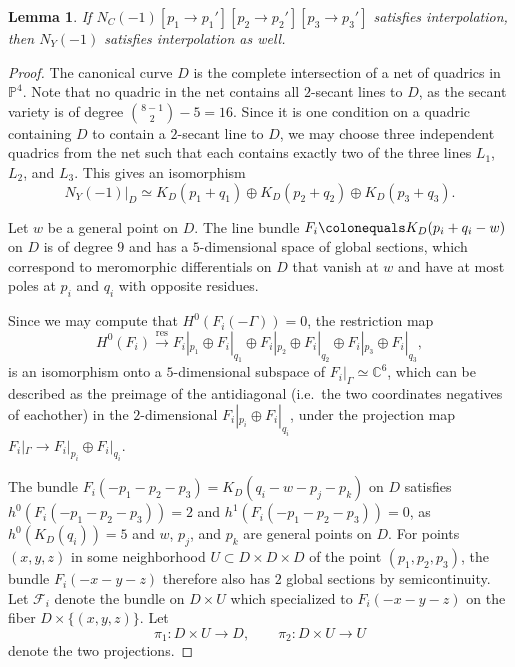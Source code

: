 \documentclass[11pt]{amsart}
\newcommand{\cc}{\mathbb{C}}
\newcommand{\pp}{\mathbb{P}}
\newcommand{\res}{\operatorname{res}}
\newtheorem{lem}[thm]{Lemma}
\theoremstyle{definition}
\theoremstyle{remark}
\begin{document}
\begin{lem}\label{canonical_degeneration}
If $N_C(-1)[p_1 \to p_1'][p_2 \to p_2'][p_3 \to p_3']$ satisfies interpolation,
then $N_Y(-1)$ satisfies interpolation as well.
\end{lem}
\begin{proof}
The canonical curve $D$ is the complete intersection of a net of quadrics in $\pp^4$.
Note that no quadric in the net contains all $2$-secant lines to $D$,
as the secant variety is of degree $\binom{8 - 1}{2} - 5 = 16$.
Since it is one condition on a quadric containing $D$ to contain a $2$-secant line to $D$,
we may choose 
three independent quadrics from the net such that each contains exactly two of the three lines $L_1$, $L_2$, and $L_3$.
This gives an isomorphism
\begin{equation}\label{canonical_restriction} N_Y(-1)|_D \simeq K_D(p_1+q_1) \oplus K_D(p_2+q_2) \oplus K_D(p_3+q_3). \end{equation}

Let $w$ be a general point on $D$.  The line bundle $F_i \colonequals K_D(p_i + q_i - w)$ on $D$ is of degree $9$ and has a $5$-dimensional space of global sections, which correspond to meromorphic differentials on $D$ that vanish at $w$ and have at most poles at $p_i$ and $q_i$ with opposite residues.

Since we may compute that $H^0(F_i(-\Gamma)) = 0$, the restriction map
\[H^0(F_i) \xrightarrow{\res} F_i|_{p_1} \oplus F_i|_{q_1} \oplus F_i|_{p_2} \oplus F_i|_{q_2} \oplus F_i|_{p_3} \oplus F_i|_{q_3}, \]
is an isomorphism onto a $5$-dimensional subspace of $F_i |_{\Gamma} \simeq \cc^6$, which can be described
as the preimage of the antidiagonal (i.e.\ the two coordinates negatives
of eachother)
in the $2$-dimensional $F_i|_{p_i} \oplus F_i|_{q_i}$, under the projection map $F_i|_{\Gamma} \to F_i|_{p_i} \oplus F_{i}|_{q_i}$.

The bundle $F_i(-p_1-p_2-p_3) = K_D(q_i - w- p_j-p_k)$ on $D$ satisfies $h^0(F_i(-p_1-p_2-p_3)) = 2$ and $h^1(F_i(-p_1-p_2-p_3)) = 0$, as $h^0(K_D(q_i)) = 5$ and $w$, $p_j$, and $p_k$ are general points on $D$.  For points $(x,y,z)$ in some neighborhood $U \subset D \times D \times D$ of the point $(p_1, p_2, p_3)$, the bundle $F_i(-x-y-z)$ therefore also has $2$ global sections by semicontinuity.  Let $\mathcal{F}_i$ denote the bundle on $D \times U$ which specialized to $F_i(-x-y-z)$ on the fiber $D \times \{(x,y,z)\}$.  Let 
\[\pi_1 \colon D \times U \to D, \qquad \pi_2 \colon D \times U \to U \]
denote the two projections.  


\end{proof}
\end{document}
